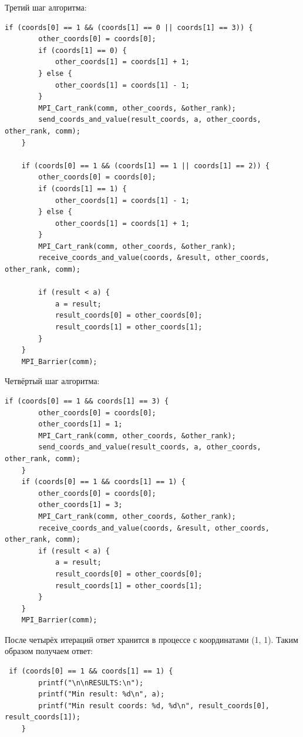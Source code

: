 \documentclass[a4paper]{article}
\begin{document}
\newpage
Третий шаг алгоритма:
\begin{lstlisting}
if (coords[0] == 1 && (coords[1] == 0 || coords[1] == 3)) {
        other_coords[0] = coords[0];
        if (coords[1] == 0) {
            other_coords[1] = coords[1] + 1;
        } else {
            other_coords[1] = coords[1] - 1;
        }
        MPI_Cart_rank(comm, other_coords, &other_rank);
        send_coords_and_value(result_coords, a, other_coords, other_rank, comm);
    }
    
    if (coords[0] == 1 && (coords[1] == 1 || coords[1] == 2)) {
        other_coords[0] = coords[0];
        if (coords[1] == 1) {
            other_coords[1] = coords[1] - 1;
        } else {
            other_coords[1] = coords[1] + 1;
        }
        MPI_Cart_rank(comm, other_coords, &other_rank);
        receive_coords_and_value(coords, &result, other_coords, other_rank, comm);
        
        if (result < a) {
            a = result;
            result_coords[0] = other_coords[0];
            result_coords[1] = other_coords[1];
        }
    }
    MPI_Barrier(comm);
\end{lstlisting}

\newpage
Четвёртый шаг алгоритма:
\begin{lstlisting}
if (coords[0] == 1 && coords[1] == 3) {
        other_coords[0] = coords[0];
        other_coords[1] = 1;
        MPI_Cart_rank(comm, other_coords, &other_rank);
        send_coords_and_value(result_coords, a, other_coords, other_rank, comm);
    }
    if (coords[0] == 1 && coords[1] == 1) {
        other_coords[0] = coords[0];
        other_coords[1] = 3;
        MPI_Cart_rank(comm, other_coords, &other_rank);
        receive_coords_and_value(coords, &result, other_coords, other_rank, comm);
        if (result < a) {
            a = result;
            result_coords[0] = other_coords[0];
            result_coords[1] = other_coords[1];
        }
    }
    MPI_Barrier(comm);
\end{lstlisting}

После четырёх итераций ответ хранится в процессе с координатами (1, 1). Таким образом получаем ответ:
\begin{lstlisting}
 if (coords[0] == 1 && coords[1] == 1) {
        printf("\n\nRESULTS:\n");
        printf("Min result: %d\n", a);
        printf("Min result coords: %d, %d\n", result_coords[0], result_coords[1]);
    }
\end{lstlisting}
\end{document}
